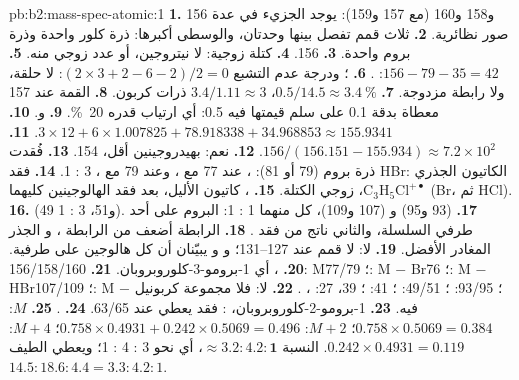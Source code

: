 \begin{solution}{pb:b2:mass-spec-atomic:1}
\textbf{1.} 156 و158 و160 (مع 157 و159): يوجد الجزيء في عدة صور نظائرية.
\textbf{2.} ثلاث قمم تفصل بينها وحدتان، والوسطى أكبرها: ذرة كلور واحدة وذرة بروم واحدة.
\textbf{3.} 156.
\textbf{4.} كتلة زوجية: لا نيتروجين، أو عدد زوجي منه.
\textbf{5.} $156 - 79 - 35 = 42$: .
\textbf{6.} ؛ ودرجة عدم التشبع $(2 \times 3 + 2 - 6 - 2)/2 = 0$: لا حلقة، ولا رابطة
مزدوجة.
\textbf{7.} $0.5/14.5 \approx 3.4~\%$، $3.4/1.11 \approx 3$ ذرات كربون.
\textbf{8.} القمة عند 157 معطاة بدقة 0.1 على سلم قيمتها فيه 0.5: أي ارتياب قدره 20~\%.
\textbf{9.}  و.
\textbf{10.} $3 \times 12 + 6 \times 1.007825 + 78.918338 + 34.968853 \approx 155.9341$.
\textbf{11.} $156/(156.151 - 155.934) \approx 7.2 \times 10^2$.
\textbf{12.} نعم: بهيدروجينين أقل، 154.
\textbf{13.} فُقدت ذرة بروم (79 أو 81): ، عند 77 مع ، وعند 79 مع ،
3 : 1.
\textbf{14.} فقد HBr: الكاتيون الجذري $\mathrm{C_3H_5Cl^{+\bullet}}$، زوجي الكتلة.
\textbf{15.} ، كاتيون الأليل، بعد فقد الهالوجينين كليهما (Br، ثم HCl).
\textbf{16.}  (49 و51، 3 : 1).
\textbf{17.}  (93 و95) و (107 و109)، كل منهما 1 : 1: البروم على أحد طرفي
السلسلة، والثاني ناتج من فقد .
\textbf{18.} الرابطة  أضعف من الرابطة ، و الجذر المغادر
الأفضل.
\textbf{19.} لا: لا قمم عند 127--131؛ و و يبيّنان أن كل هالوجين على 
طرفية.
\textbf{20.} ، أي 1-برومو-3-كلوروبروبان.
\textbf{21.} 156/158/160: M؛ 77/79: M $-$ Br؛ 76: M $-$ HBr؛ 107/109: M $-$ ؛
93/95: ؛ 49/51: ؛ 41: ؛ 39، 27: ، .
\textbf{22.} لا: فلا مجموعة كربونيل فيه.
\textbf{23.} 1-برومو-2-كلوروبروبان، : فقد  يعطي  عند 63/65.
\textbf{24.} .
\textbf{25.} $M$: $0.758 \times 0.5069 = 0.384$؛ $M+2$: $0.758 \times 0.4931 + 0.242 \times 0.5069 =
0.496$؛ $M+4$: $0.242 \times 0.4931 = 0.119$. النسبة $\boldsymbol{\approx 3.2 : 4.2 : 1}$، أي نحو 3 : 4 :
1؛ ويعطي الطيف $14.5 : 18.6 : 4.4 = 3.3 : 4.2 : 1$.
\end{solution}
